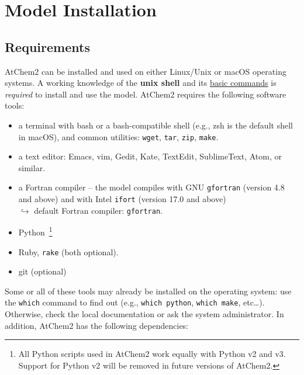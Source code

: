 %
%
%
%

\chapter{Model Installation} \label{ch:installation}

\section{Requirements} \label{sec:requirements}

AtChem2 can be installed and used on either Linux/Unix or macOS
operating systems. A working knowledge of the \textbf{unix shell} and
its \href{https://swcarpentry.github.io/shell-novice}{basic commands}
is \emph{required} to install and use the model. AtChem2 requires the
following software tools:

\begin{itemize}
\item a terminal with bash or a bash-compatible shell (e.g., zsh is
  the default shell in macOS), and common utilities: \texttt{wget},
  \texttt{tar}, \texttt{zip}, \texttt{make}.
\item a text editor: Emacs, vim, Gedit, Kate, TextEdit, SublimeText,
  Atom, or similar.
\item a Fortran compiler -- the model compiles with GNU \texttt{gfortran}
  (version 4.8 and above) and with Intel \texttt{ifort} (version 17.0 and above)\\
  $\hookrightarrow$ default Fortran compiler: \texttt{gfortran}.
\item Python~\footnote{All Python scripts used in AtChem2 work equally
    with Python v2 and v3. Support for Python v2 will be removed in
    future versions of AtChem2.}
\item Ruby, \texttt{rake} (both optional).
\item git (optional)
\end{itemize}

Some or all of these tools may already be installed on the operating
system: use the \texttt{which} command to find out (e.g.,
\verb|which python|, \verb|which make|, etc\ldots). Otherwise, check
the local documentation or ask the system administrator. In addition,
AtChem2 has the following dependencies:

